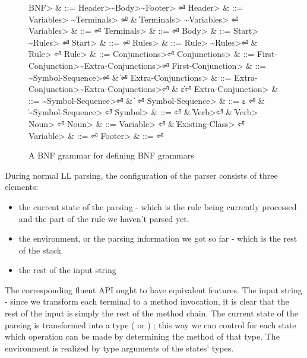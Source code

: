 \begin{figure}[H]
  \begin{Grammar}
    \begin{aligned}
      \<BNF> & ::= \<Header>\~\<Body>\~\<Footer> \hfill⏎
      \<Header> & ::= \<Variables> \~\<Terminals> \hfill⏎
      {} & \| \<Terminals> \~\<Variables> \hfill⏎
      \<Variables> & ::= \hfill⏎
      \<Terminals> & ::= \hfill⏎
      \<Body> & ::= \<Start> \~\<Rules> \hfill⏎
      \<Start> & ::=  \hfill⏎
      \<Rules> & ::= \<Rule> \~\<Rules>\hfill⏎
      {} & \| \<Rule> \hfill⏎
      \<Rule> & ::=  \<Conjunctions>\hfill⏎
      \<Conjunctions> & ::= \<First-Conjunction>\~\<Extra-Conjunctions>\hfill⏎
      \<First-Conjunction> & ::= \~\<Symbol-Sequence>\hfill⏎
      {} & \| \hfill⏎
      \<Extra-Conjunctions> & ::= \<Extra-Conjunction>\~\<Extra-Conjunctions>\hfill⏎
      {} & \| ε\hfill⏎
      \<Extra-Conjunction> & ::= \~\<Symbol-Sequence>\hfill⏎
      {} & \|  \hfill⏎
      \<Symbol-Sequence> & ::= ε \hfill⏎
      {} & \| \~\<Symbol-Sequence> \hfill⏎
      \<Symbol> & ::=  \hfill⏎
      {} & \| \<Verb>\hfill⏎
      {} & \| \<Verb>~\cc{,} \<Noun> \hfill⏎
      \<Noun> & ::= \<Variable> \hfill⏎
      {} & \| \<Existing-Class> \hfill⏎
      \<Variable> & ::=  \hfill⏎
      \<Footer> & ::= \hfill⏎
    \end{aligned}
  \end{Grammar}
  \caption{A BNF grammar for defining BNF grammars}
  \label{Figure:BNF:BNF}
\end{figure}
During normal LL parsing, the configuration of the parser consists
  of three elements:
\begin{itemize}
  \item the current state of the parsing - which is the
    rule being currently processed and the part of the rule we
    haven't parsed yet.
  \item the environment, or the parsing information we got so far -
    which is the rest of the stack
  \item the rest of the input string
\end{itemize}

The corresponding \Java fluent API ought to have equivalent features.
The input string - since we transform each
  terminal to a method invocation, it is clear that the rest of the input is
  simply the rest of the method chain.
The current state of the parsing is transformed into a \Java type
  ( or ) ; this way we can control for each state
  which operation can be made by determining the method of that type.
The environment is realized by type arguments of the states' \Java types.

